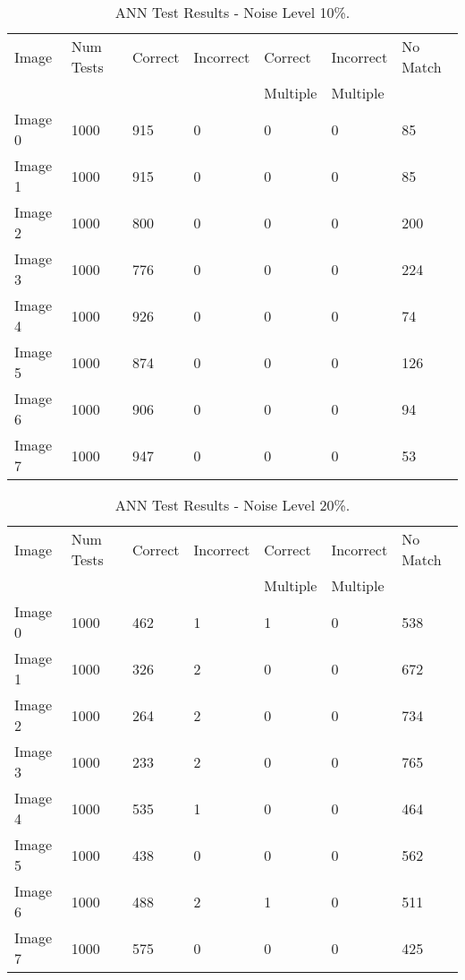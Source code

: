 \begin{table}[tbh]
\caption{ANN Test Results - Noise Level 10\%. \label{table:ann10}}
\begin{center}
\begin{tabular}{|l|l|l|l|l|l|l|}
  \hline
  Image & Num Tests & Correct & Incorrect & Correct & Incorrect & No Match \\
  &&&&Multiple&Multiple&\\
 \hline
  Image 0 & 1000 & 915 & 0 & 0 & 0 & 85\\
\hline
  Image 1 & 1000 & 915 & 0 & 0 & 0 & 85 \\ 
\hline
  Image 2 & 1000 & 800 & 0 & 0 & 0 & 200 \\
\hline
  Image 3 & 1000 & 776 & 0 & 0 & 0 & 224\\
\hline
  Image 4 &1000 & 926 & 0 & 0 & 0 & 74 \\
\hline
  Image 5 &1000 & 874 & 0 & 0 & 0 & 126 \\
\hline
  Image 6 & 1000 & 906 & 0 & 0 & 0 & 94\\
\hline
  Image 7 & 1000 & 947 & 0 & 0 & 0 & 53\\
  \hline
\end{tabular}
\end{center}
\end{table}

\begin{table}[tbh]
\caption{ANN Test Results - Noise Level 20\%. \label{table:ann20}}
\begin{center}
\begin{tabular}{|l|l|l|l|l|l|l|}
  \hline
  Image & Num Tests & Correct & Incorrect & Correct & Incorrect & No Match \\
  &&&&Multiple&Multiple&\\
 \hline
  Image 0 & 1000 & 462 & 1 & 1 & 0 & 538\\
\hline
  Image 1 & 1000 & 326 & 2 & 0 & 0 & 672 \\ 
\hline
  Image 2 & 1000 & 264 & 2 & 0 & 0 & 734 \\
\hline
  Image 3 & 1000 & 233 & 2 & 0 & 0 & 765\\
\hline
  Image 4 &1000 & 535 & 1 & 0 & 0 & 464 \\
\hline
  Image 5 &1000 & 438 & 0 & 0 & 0 & 562 \\
\hline
  Image 6 & 1000 & 488 & 2 & 1 & 0 & 511\\
\hline
  Image 7 & 1000 & 575 & 0 & 0 & 0 & 425\\
  \hline
\end{tabular}
\end{center}
\end{table}

